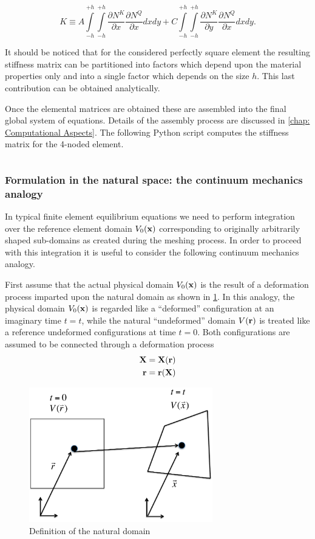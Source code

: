 \[K \equiv A\int\limits_{ - h}^{ + h} {\int\limits_{ - h}^{ + h} {\frac{{\partial {N^K}}}{{\partial x}}\frac{{\partial {N^Q}}}{{\partial x}}dxdy} }  + C\int\limits_{ - h}^{ + h} {\int\limits_{ - h}^{ + h} {\frac{{\partial {N^K}}}{{\partial y}}\frac{{\partial {N^Q}}}{{\partial x}}dxdy.} } \]

It should be noticed that for the considered perfectly square element the resulting stiffness matrix can be partitioned into factors which depend upon the material properties only and into a single factor which depends on the size $h$. This last contribution can be obtained analytically.

Once the elemental matrices are obtained these are assembled into the final global system of equations. Details of the assembly process are discussed in \autoref{chap: Computational Aspects}. The following Python script computes the stiffness matrix for the 4-noded element.

\inputminted[]{python}{src/stiff_4nodes.py}

\subsubsection{Formulation in the natural space: the continuum mechanics analogy}
In typical finite element equilibrium equations we need to perform integration over the reference element domain $V_0(\vb{x})$ corresponding to originally arbitrarily shaped sub-domains as created during the meshing process.  In order to proceed with this integration it is useful to consider the following continuum mechanics analogy.

First assume that the actual physical domain $V_0(\vb{x})$ is the result of a deformation process imparted upon the natural domain as shown in \cref{fig:natural domain}. In this analogy, the physical domain $V_0(\vb{x})$ is regarded like a ``deformed'' configuration at an imaginary time $t=t$, while the natural ``undeformed'' domain $V(\vb{r})$   is treated like a reference undeformed configurations at time $t=0$. Both configurations are assumed to be connected through a deformation process
\begin{equation}
\begin{aligned}
\vb{X}&=\vb{X}(\vb{r})\\
\vb{r}&=\vb{r}(\vb{X})
\end{aligned}
\label{eq:motion}
\end{equation}
\begin{figure}[h]
\centering
\includegraphics[width=8cm]{figure1.pdf}
\caption{Definition of the natural domain}
\label{fig:natural domain}
\end{figure} 


